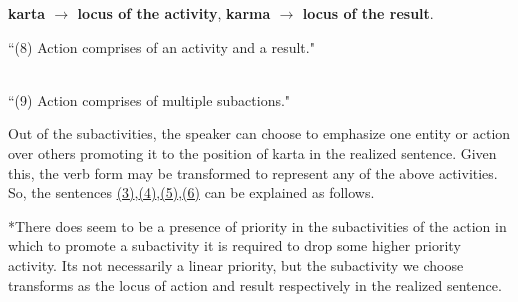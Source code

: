 \documentclass[twoside]{article}
\begin{document}
\begin{center}

\begin{mdframed}[style=MyFrame2]
\begin{center}


\textbf{karta $\rightarrow$ locus of the activity}, 
\textbf{karma $\rightarrow$ locus of the result}.


\end{center}

\end{mdframed}





``(8) Action comprises of an activity and a result."


\hypertarget{fig9}{}
 \\

``(9) Action comprises of multiple subactions."
\end{center}
Out of the subactivities, the speaker can choose to emphasize one entity or action over others promoting it to the position of karta in the realized sentence.
Given this, the verb form may be transformed to represent any of the above activities. So, the sentences \hyperlink{fig3}{(3)},\hyperlink{fig4}{(4)},\hyperlink{fig5}{(5)},\hyperlink{fig6}{(6)} can be explained as follows.


*There does seem to be a presence of priority in the
subactivities of the action in which to promote a
subactivity it is required to drop some higher priority
activity.
Its not necessarily a linear priority, but the subactivity
we choose transforms as the locus of action and result
respectively in the realized sentence.
\end{document}
